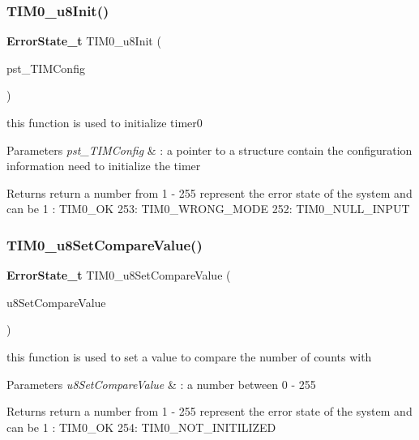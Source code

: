 \subsubsection{T\+I\+M0\+\_\+u8\+Init()}
{\footnotesize\ttfamily \textbf{ Error\+State\+\_\+t} T\+I\+M0\+\_\+u8\+Init (\begin{DoxyParamCaption}\item[{\textbf{ T\+I\+M0\+\_\+\+Config\+\_\+t} $\ast$}]{pst\+\_\+\+T\+I\+M\+Config }\end{DoxyParamCaption})}



this function is used to initialize timer0 


\begin{DoxyParams}{Parameters}
{\em pst\+\_\+\+T\+I\+M\+Config} & \+: a pointer to a structure contain the configuration information need to initialize the timer \\
\hline
\end{DoxyParams}
\begin{DoxyReturn}{Returns}
return a number from 1 -\/ 255 represent the error state of the system and can be 1 \+: T\+I\+M0\+\_\+\+OK 253\+: T\+I\+M0\+\_\+\+W\+R\+O\+N\+G\+\_\+\+M\+O\+DE 252\+: T\+I\+M0\+\_\+\+N\+U\+L\+L\+\_\+\+I\+N\+P\+UT 
\end{DoxyReturn}
\mbox{\label{_t_i_m_e_r0_8c_a689d58acea491f346ef7ea249f7c98e0}} 
\subsubsection{T\+I\+M0\+\_\+u8\+Set\+Compare\+Value()}
{\footnotesize\ttfamily \textbf{ Error\+State\+\_\+t} T\+I\+M0\+\_\+u8\+Set\+Compare\+Value (\begin{DoxyParamCaption}\item[{\textbf{ uint8\+\_\+t}}]{u8\+Set\+Compare\+Value }\end{DoxyParamCaption})}



this function is used to set a value to compare the number of counts with 


\begin{DoxyParams}{Parameters}
{\em u8\+Set\+Compare\+Value} & \+: a number between 0 -\/ 255 \\
\hline
\end{DoxyParams}
\begin{DoxyReturn}{Returns}
return a number from 1 -\/ 255 represent the error state of the system and can be 1 \+: T\+I\+M0\+\_\+\+OK 254\+: T\+I\+M0\+\_\+\+N\+O\+T\+\_\+\+I\+N\+I\+T\+I\+L\+I\+Z\+ED 
\end{DoxyReturn}
\mbox{\label{_t_i_m_e_r0_8c_ab588fb0557b32e1d9b4c1c075a413c37}} 
